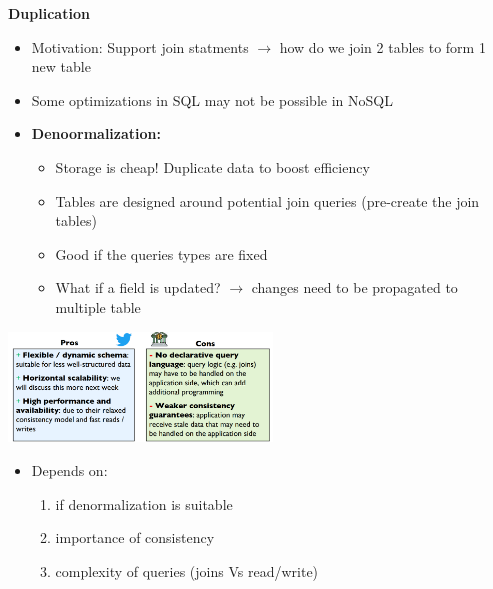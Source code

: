 \documentclass[10pt, landscape]{article}
\begin{document}
\begin{multicols}{4}
\textbf{Duplication}
\begin{itemize}
  \item Motivation: Support join statments $\rightarrow$ how do we join 2 tables to form 1 new table 
  \item Some optimizations in SQL may not be possible in NoSQL
  \item \textbf{Denoormalization: } 
  \begin{itemize}
    \item Storage is cheap! Duplicate data to boost efficiency
    \item Tables are designed around potential join queries (pre-create the join tables)
    \item Good if the queries types are fixed 
    \item What if a field is updated? $\rightarrow$ changes need to be propagated to multiple table 
  \end{itemize}
\end{itemize}

\includegraphics*[width=7cm]{nosql_pros_cons}
\begin{itemize}
  \item Depends on: 
  \begin{enumerate}
    \item if denormalization is suitable
    \item importance of consistency 
    \item complexity of queries (joins Vs read/write)
  \end{enumerate}
\end{itemize}




\end{multicols}
\end{document}
